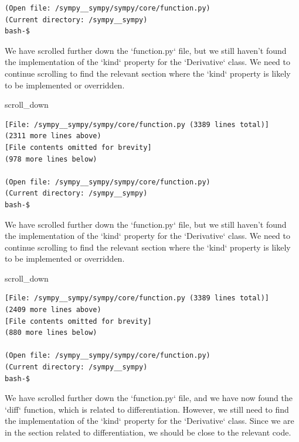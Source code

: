 {\begin{observationbox}
\begin{Verbatim}[breaklines=true, breakanywhere=true]
(Open file: /sympy__sympy/sympy/core/function.py)
(Current directory: /sympy__sympy)
bash-$
\end{Verbatim}
\end{observationbox}
\begin{agentbox}
We have scrolled further down the `function.py` file, but we still haven't found the implementation of the `kind` property for the `Derivative` class. We need to continue scrolling to find the relevant section where the `kind` property is likely to be implemented or overridden.



\hrulefill
\begin{CodeVerbatim}[breaklines=true, breakanywhere=true]
scroll_down
\end{CodeVerbatim}
\end{agentbox}
\begin{observationbox}\begin{Verbatim}[breaklines=true, breakanywhere=true]
[File: /sympy__sympy/sympy/core/function.py (3389 lines total)]
(2311 more lines above)
[File contents omitted for brevity]
(978 more lines below)

(Open file: /sympy__sympy/sympy/core/function.py)
(Current directory: /sympy__sympy)
bash-$
\end{Verbatim}
\end{observationbox}
\begin{agentbox}
We have scrolled further down the `function.py` file, but we still haven't found the implementation of the `kind` property for the `Derivative` class. We need to continue scrolling to find the relevant section where the `kind` property is likely to be implemented or overridden.



\hrulefill
\begin{CodeVerbatim}[breaklines=true, breakanywhere=true]
scroll_down
\end{CodeVerbatim}
\end{agentbox}
\begin{observationbox}\begin{Verbatim}[breaklines=true, breakanywhere=true]
[File: /sympy__sympy/sympy/core/function.py (3389 lines total)]
(2409 more lines above)
[File contents omitted for brevity]
(880 more lines below)

(Open file: /sympy__sympy/sympy/core/function.py)
(Current directory: /sympy__sympy)
bash-$
\end{Verbatim}
\end{observationbox}
\begin{agentbox}
We have scrolled further down the `function.py` file, and we have now found the `diff` function, which is related to differentiation. However, we still need to find the implementation of the `kind` property for the `Derivative` class. Since we are in the section related to differentiation, we should be close to the relevant code.




\end{agentbox}}
